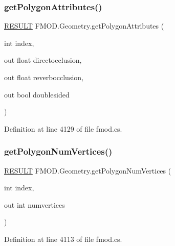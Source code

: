 \subsubsection{\texorpdfstring{get\+Polygon\+Attributes()}{getPolygonAttributes()}}
{\footnotesize\ttfamily \hyperlink{namespace_f_m_o_d_a305d1176ef3f8c8815861a60407ac33d}{R\+E\+S\+U\+LT} F\+M\+O\+D.\+Geometry.\+get\+Polygon\+Attributes (\begin{DoxyParamCaption}\item[{int}]{index,  }\item[{out float}]{directocclusion,  }\item[{out float}]{reverbocclusion,  }\item[{out bool}]{doublesided }\end{DoxyParamCaption})}



Definition at line 4129 of file fmod.\+cs.

\mbox{\label{class_f_m_o_d_1_1_geometry_afd25eca4187834a8b3466345852ce2d2}} 
\subsubsection{\texorpdfstring{get\+Polygon\+Num\+Vertices()}{getPolygonNumVertices()}}
{\footnotesize\ttfamily \hyperlink{namespace_f_m_o_d_a305d1176ef3f8c8815861a60407ac33d}{R\+E\+S\+U\+LT} F\+M\+O\+D.\+Geometry.\+get\+Polygon\+Num\+Vertices (\begin{DoxyParamCaption}\item[{int}]{index,  }\item[{out int}]{numvertices }\end{DoxyParamCaption})}



Definition at line 4113 of file fmod.\+cs.

\mbox{\label{class_f_m_o_d_1_1_geometry_a9cf35f206581bd84eb6d1c04d499cbf7}} 
